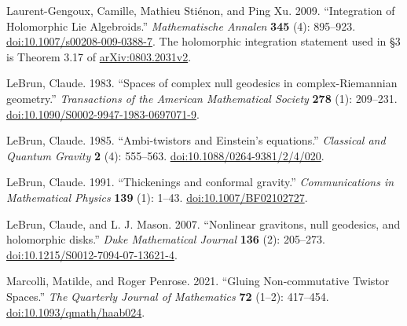 \documentclass[
  english,
  11pt,
  reqno]{amsart}
\begin{document}
\begin{thebibliography}{}
\protect{}\label{ref:LaurentGengouxStienonXu2009}

Laurent-Gengoux, Camille, Mathieu Stiénon, and Ping Xu. 2009.
``Integration of Holomorphic Lie Algebroids.'' \emph{Mathematische
Annalen} \textbf{345} (4): 895--923.
\href{https://doi.org/10.1007/s00208-009-0388-7}{doi:10.1007/s00208-009-0388-7}.
The holomorphic integration statement used in §3 is Theorem 3.17 of
\href{https://arxiv.org/abs/0803.2031v2}{arXiv:0803.2031v2}.

\protect{}\label{ref:LeBrun1983}

LeBrun, Claude. 1983. ``Spaces of complex null geodesics in
complex-Riemannian geometry.'' \emph{Transactions of the American
Mathematical Society} \textbf{278} (1): 209--231.
\href{https://doi.org/10.1090/S0002-9947-1983-0697071-9}{doi:10.1090/S0002-9947-1983-0697071-9}.

\protect{}\label{ref:LeBrun1985}

LeBrun, Claude. 1985. ``Ambi-twistors and Einstein's equations.''
\emph{Classical and Quantum Gravity} \textbf{2} (4): 555--563.
\href{https://doi.org/10.1088/0264-9381/2/4/020}{doi:10.1088/0264-9381/2/4/020}.

\protect{}\label{ref:LeBrun1991}

LeBrun, Claude. 1991. ``Thickenings and conformal gravity.''
\emph{Communications in Mathematical Physics} \textbf{139} (1): 1--43.
\href{https://doi.org/10.1007/BF02102727}{doi:10.1007/BF02102727}.

\protect{}\label{ref:LeBrunMason2007}

LeBrun, Claude, and L. J. Mason. 2007. ``Nonlinear gravitons, null
geodesics, and holomorphic disks.'' \emph{Duke Mathematical Journal}
\textbf{136} (2): 205--273.
\href{https://doi.org/10.1215/S0012-7094-07-13621-4}{doi:10.1215/S0012-7094-07-13621-4}.

\protect{}\label{ref:MarcolliPenrose2021}

Marcolli, Matilde, and Roger Penrose. 2021. ``Gluing Non-commutative
Twistor Spaces.'' \emph{The Quarterly Journal of Mathematics}
\textbf{72} (1--2): 417--454.
\href{https://doi.org/10.1093/qmath/haab024}{doi:10.1093/qmath/haab024}.

\protect{}\label{ref:Penrose1976}


\end{thebibliography}
\end{document}
